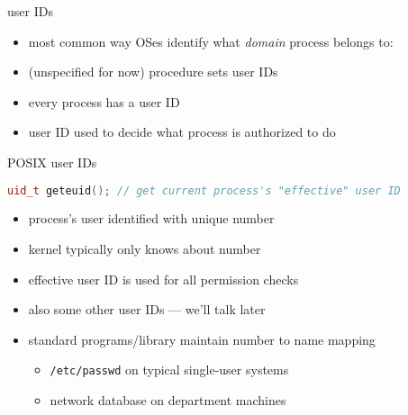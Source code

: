 \begin{frame}{user IDs}
    \begin{itemize}
    \item most common way OSes identify what \textit{domain} process belongs to:
    \vspace{.5cm}
    \item (unspecified for now) procedure sets user IDs
    \item every process has a user ID
    \item user ID used to decide what process is authorized to do
    \end{itemize}
\end{frame}

\begin{frame}[fragile,label=posixUID]{POSIX user IDs}
\begin{lstlisting}[language=C++,style=small]
uid_t geteuid(); // get current process's "effective" user ID
\end{lstlisting}
\begin{itemize}
\item process's user identified with unique number
\item kernel typically only knows about number
\item effective user ID is used for all permission checks
\item also some other user IDs --- we'll talk later
\vspace{.5cm}
\item<2-> standard programs/library maintain number to name mapping
    \begin{itemize}
    \item<2-> \texttt{/etc/passwd} on typical single-user systems
    \item<2-> network database on department machines
    \end{itemize}
\end{itemize}
\end{frame}
